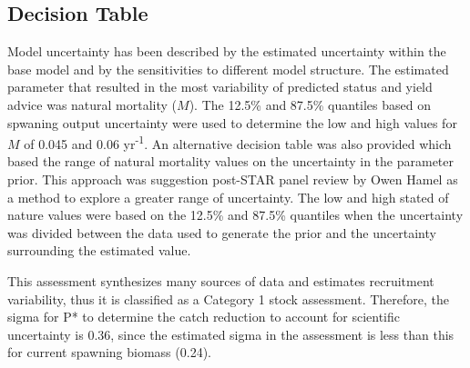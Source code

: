 \documentclass[12pt,]{article}
\begin{document}
\subsection*{Decision Table}\label{decision-table}

Model uncertainty has been described by the estimated uncertainty within
the base model and by the sensitivities to different model structure.
The estimated parameter that resulted in the most variability of
predicted status and yield advice was natural mortality (\(M\)). The
12.5\% and 87.5\% quantiles based on spwaning output uncertainty were
used to determine the low and high values for \(M\) of 0.045 and 0.06
yr\textsuperscript{-1}. An alternative decision table was also provided
which based the range of natural mortality values on the uncertainty in
the parameter prior. This approach was suggestion post-STAR panel review
by Owen Hamel as a method to explore a greater range of uncertainty. The
low and high stated of nature values were based on the 12.5\% and 87.5\%
quantiles when the uncertainty was divided between the data used to
generate the prior and the uncertainty surrounding the estimated value.

This assessment synthesizes many sources of data and estimates
recruitment variability, thus it is classified as a Category 1 stock
assessment. Therefore, the sigma for P* to determine the catch reduction
to account for scientific uncertainty is 0.36, since the estimated sigma
in the assessment is less than this for current spawning biomass (0.24).
\end{document}
